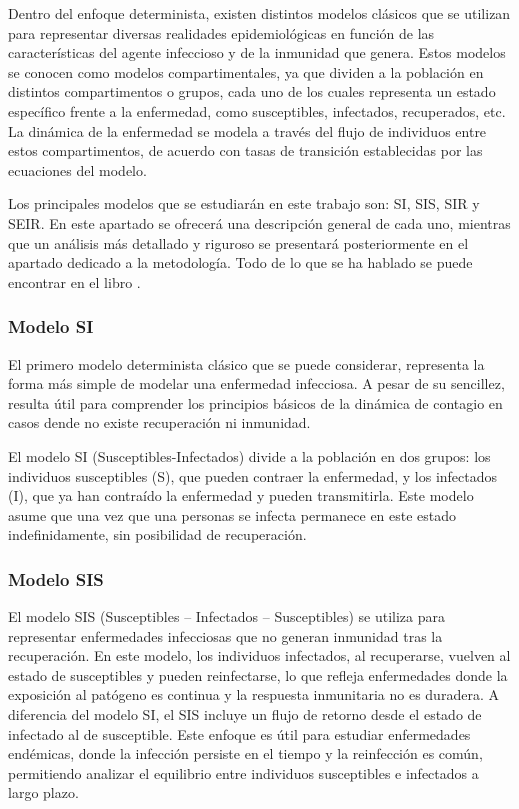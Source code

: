 Dentro del enfoque determinista, existen distintos modelos clásicos que se utilizan para representar diversas realidades epidemiológicas en función de las características del agente infeccioso y de la inmunidad que genera. Estos modelos se conocen como modelos compartimentales, ya que dividen a la población en distintos compartimentos o grupos, cada uno de los cuales representa un estado específico frente a la enfermedad, como susceptibles, infectados, recuperados, etc. La dinámica de la enfermedad se modela a través del flujo de individuos entre estos compartimentos, de acuerdo con tasas de transición establecidas por las ecuaciones del modelo.

Los principales modelos que se estudiarán en este trabajo son: SI, SIS, SIR y SEIR. En este apartado se ofrecerá una descripción general de cada uno, mientras que un análisis más detallado y riguroso se presentará posteriormente en el apartado dedicado a la metodología. Todo de lo que se ha hablado se puede encontrar en el libro \cite{allen2008mathematical}.

\subsubsection*{Modelo SI}
El primero modelo determinista clásico que se puede considerar, representa la forma más simple de modelar una enfermedad infecciosa. A pesar de su sencillez, resulta útil para comprender los principios básicos de la dinámica de contagio en casos dende no existe recuperación ni inmunidad.

El modelo SI (Susceptibles-Infectados) divide a la población en dos grupos: los individuos susceptibles (S), que pueden contraer la enfermedad, y los infectados (I), que ya han contraído la enfermedad y pueden transmitirla. Este modelo asume que una vez que una personas se infecta permanece en este estado indefinidamente, sin posibilidad de recuperación.


\subsubsection*{Modelo SIS}
El modelo SIS (Susceptibles – Infectados – Susceptibles) se utiliza para representar enfermedades infecciosas que no generan inmunidad tras la recuperación. En este modelo, los individuos infectados, al recuperarse, vuelven al estado de susceptibles y pueden reinfectarse, lo que refleja enfermedades donde la exposición al patógeno es continua y la respuesta inmunitaria no es duradera. A diferencia del modelo SI, el SIS incluye un flujo de retorno desde el estado de infectado al de susceptible. Este enfoque es útil para estudiar enfermedades endémicas, donde la infección persiste en el tiempo y la reinfección es común, permitiendo analizar el equilibrio entre individuos susceptibles e infectados a largo plazo.


